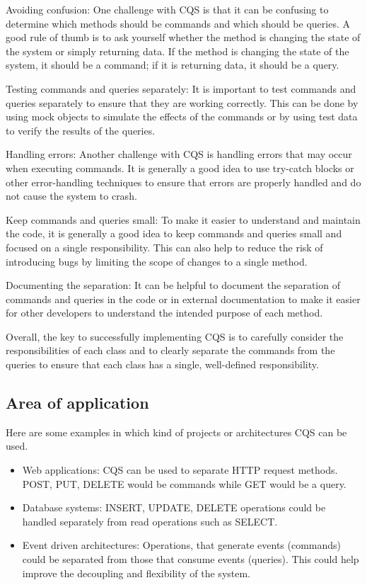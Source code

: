\documentclass[11pt,conference]{IEEEtran}
\begin{document}
Avoiding confusion: One challenge with CQS is that it can be confusing to determine which methods should be commands and which should be queries. A good rule of thumb is to ask yourself whether the method is changing the state of the system or simply returning data. If the method is changing the state of the system, it should be a command; if it is returning data, it should be a query.

Testing commands and queries separately: It is important to test commands and queries separately to ensure that they are working correctly. This can be done by using mock objects to simulate the effects of the commands or by using test data to verify the results of the queries.

Handling errors: Another challenge with CQS is handling errors that may occur when executing commands. It is generally a good idea to use try-catch blocks or other error-handling techniques to ensure that errors are properly handled and do not cause the system to crash.

Keep commands and queries small: To make it easier to understand and maintain the code, it is generally a good idea to keep commands and queries small and focused on a single responsibility. This can also help to reduce the risk of introducing bugs by limiting the scope of changes to a single method.

Documenting the separation: It can be helpful to document the separation of commands and queries in the code or in external documentation to make it easier for other developers to understand the intended purpose of each method.

Overall, the key to successfully implementing CQS is to carefully consider the responsibilities of each class and to clearly separate the commands from the queries to ensure that each class has a single, well-defined responsibility.

\subsection{Area of application}

Here are some examples in which kind of projects or architectures CQS can be used.

\begin{itemize}
    \item {Web applications: CQS can be used to separate HTTP request methods. POST, PUT, DELETE would be commands while GET would be a query.}
    \item {Database systems: INSERT, UPDATE, DELETE operations could be handled separately from read operations such as SELECT.}
    \item {Event driven architectures: Operations, that generate events (commands) could be separated from those that consume events (queries). This could help improve the decoupling and flexibility of the system.}
\end{itemize}
\end{document}
